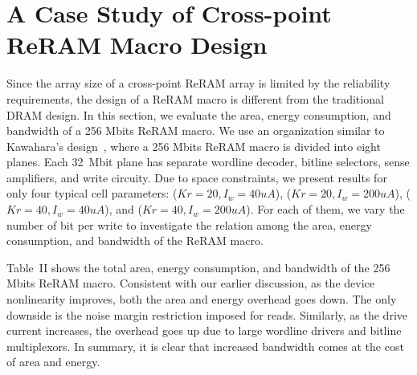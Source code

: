 \vspace{-5pt}
\section{A Case Study of Cross-point ReRAM Macro Design}\label{sec:macro}
Since the array size of a cross-point ReRAM array is limited by
the reliability requirements, the design of a ReRAM macro is different
from the traditional DRAM design. 
In this section, we evaluate the area, energy consumption, and bandwidth of a
256 Mbits ReRAM macro.
We use an organization similar to Kawahara's design~\cite{crossbar_Panasonic}, where
a 256 Mbits ReRAM macro is divided into 
eight planes. Each 32~Mbit plane has separate wordline
decoder, bitline selectors, sense amplifiers, and write circuity. Due to
space constraints, we present results for only
four typical cell parameters: ($Kr=20,
I_w=40uA$), ($Kr=20, I_w=200uA$), ($Kr=40, I_w=40uA$), and ($Kr=40,
I_w=200uA$). For each of them, we vary the number of bit per write to
investigate the relation among the area, energy consumption, and bandwidth
of the ReRAM macro.


Table~II shows the total area, energy consumption, and bandwidth of the
256 Mbits ReRAM macro. Consistent with our earlier discussion, 
as the device nonlinearity improves, both the area and energy 
overhead goes down. The only downside is the noise margin restriction
imposed for reads. Similarly, as the drive current increases, the overhead
goes up due to large wordline drivers and bitline multiplexors. 
In summary, it is clear that increased bandwidth comes at the cost of area
and energy. 

